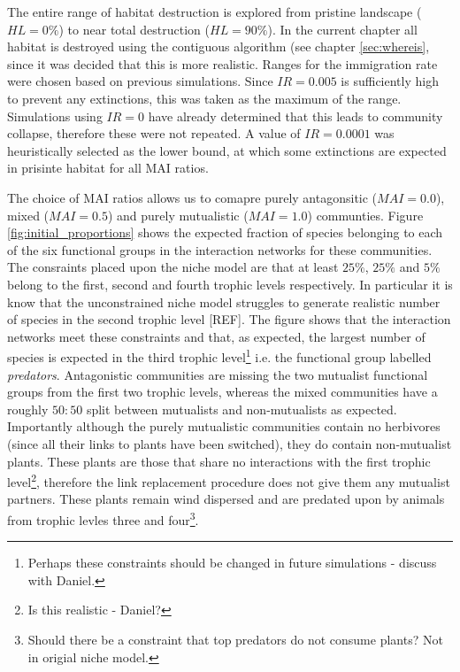 \begin{itemize}
The entire range of habitat destruction is explored from pristine landscape ($HL=0\%$) to near total destruction ($HL=90\%$). In the current chapter all habitat is destroyed using the contiguous algorithm (see chapter \ref{sec:whereis}, since it was decided that this is more realistic. Ranges for the immigration rate were chosen based on previous simulations. Since $IR=0.005$ is sufficiently high to prevent any extinctions, this was taken as the maximum of the range. Simulations using $IR=0$ have already determined that this leads to community collapse, therefore these were not repeated. A value of $IR=0.0001$ was heuristically selected as the lower bound, at which some extinctions are expected in prisinte habitat for all MAI ratios.

The choice of MAI ratios allows us to comapre purely antagonsitic ($MAI=0.0$), mixed ($MAI=0.5$) and purely mutualistic ($MAI=1.0$) communties. Figure \ref{fig:initial_proportions} shows the expected fraction of species belonging to each of the six functional groups in the interaction networks for these communities. The consraints placed upon the niche model are that at least $25\%$, $25\%$ and $5\%$ belong to the first, second and fourth trophic levels respectively. In particular it is know that the unconstrained niche model struggles to generate realistic number of species in the second trophic level [REF]. The figure shows that the interaction networks meet these constraints and that, as expected, the largest number of species is expected in the third trophic level\footnote{Perhaps these constraints should be changed in future simulations - discuss with Daniel.} i.e. the functional group labelled \emph{predators}. Antagonistic communities are missing the two mutualist functional groups from the first two trophic levels, whereas the mixed communities have a roughly $50:50$ split between mutualists and non-mutualists as expected. Importantly although the purely mutualistic communities contain no herbivores (since all their links to plants have been switched), they do contain non-mutualist plants. These plants are those that share no interactions with the first trophic level\footnote{Is this realistic - Daniel?}, therefore the link replacement procedure does not give them any mutualist partners. These plants remain wind dispersed and are predated upon by animals from trophic levles three and four\footnote{Should there be a constraint that top predators do not consume plants? Not in origial niche model.}.   

\clearpage
\thispagestyle{empty}
\begin{figure}


\end{figure}
\end{itemize}
